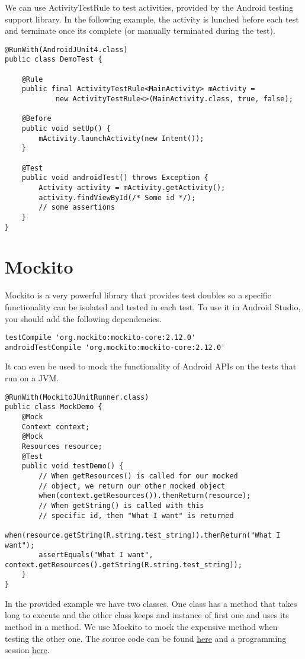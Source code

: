 We can use ActivityTestRule to test activities, provided by the Android testing support library. In the following example, the activity is lunched before each test and terminate once its complete (or manually terminated during the test).
\begin{lstlisting}[style=A_Java]
@RunWith(AndroidJUnit4.class)
public class DemoTest {
    
    @Rule
    public final ActivityTestRule<MainActivity> mActivity =
            new ActivityTestRule<>(MainActivity.class, true, false);

    @Before
    public void setUp() {
        mActivity.launchActivity(new Intent());
    }
    
    @Test
    public void androidTest() throws Exception {
        Activity activity = mActivity.getActivity();
        activity.findViewById(/* Some id */);
        // some assertions
    }
}
\end{lstlisting}

\section{Mockito}
Mockito is a very powerful library that provides test doubles so a specific functionality can be isolated and tested in each test. To use it in Android Studio, you should add the following dependencies.
\begin{lstlisting}[style=A_txt]
testCompile 'org.mockito:mockito-core:2.12.0'
androidTestCompile 'org.mockito:mockito-core:2.12.0'
\end{lstlisting}
It can even be used to mock the functionality of Android APIs on the tests that run on a JVM.
\begin{lstlisting}[style=A_Java]
@RunWith(MockitoJUnitRunner.class)
public class MockDemo {
    @Mock
    Context context;
    @Mock
    Resources resource;
    @Test
    public void testDemo() {
        // When getResources() is called for our mocked 
        // object, we return our other mocked object
        when(context.getResources()).thenReturn(resource);
        // When getString() is called with this 
        // specific id, then "What I want" is returned
        when(resource.getString(R.string.test_string)).thenReturn("What I want");
        assertEquals("What I want", context.getResources().getString(R.string.test_string));
    }
}
\end{lstlisting}
In the provided example we have two classes. One class has a method that takes long to execute and the other class keeps and instance of first one and uses its method in a method. We use Mockito to mock the expensive method when testing the other one. The source code can be found \href{https://github.com/JonSteinn/AndroidDevelopment/tree/master/examples/lab6/mocktest}{here} and a programming session \href{TODO}{here}.

